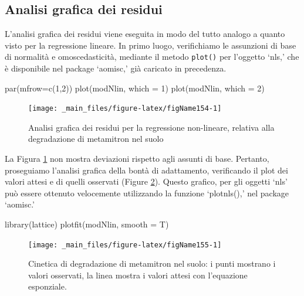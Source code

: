 \documentclass[a4paper,12pt,oneside]{book}
\newenvironment{Shaded}{\begin{snugshade}}{\end{snugshade}}
\newcommand{\DecValTok}[1]{#1}
\newcommand{\FunctionTok}[1]{#1}
\newcommand{\AttributeTok}[1]{#1}
\newcommand{\NormalTok}[1]{#1}
\begin{document}
\hypertarget{analisi-grafica-dei-residui-1}{%
\subsection{Analisi grafica dei residui}\label{analisi-grafica-dei-residui-1}}

L'analisi grafica dei residui viene eseguita in modo del tutto analogo a quanto visto per la regressione lineare. In primo luogo, verifichiamo le assunzioni di base di normalità e omoscedasticità, mediante il metodo \texttt{plot()} per l'oggetto `nls,' che è disponibile nel package `aomisc,' già caricato in precedenza.

\begin{Shaded}
\begin{Highlighting}[]
\FunctionTok{par}\NormalTok{(}\AttributeTok{mfrow=}\FunctionTok{c}\NormalTok{(}\DecValTok{1}\NormalTok{,}\DecValTok{2}\NormalTok{))}
\FunctionTok{plot}\NormalTok{(modNlin, }\AttributeTok{which =} \DecValTok{1}\NormalTok{)}
\FunctionTok{plot}\NormalTok{(modNlin, }\AttributeTok{which =} \DecValTok{2}\NormalTok{)}
\end{Highlighting}
\end{Shaded}

\begin{figure}

{\centering \texttt{[image: \_main\_files/figure-latex/figName154-1]} 

}

\caption{Analisi grafica dei residui per la regressione non-lineare, relativa alla degradazione di metamitron nel suolo}\label{fig:figName154}
\end{figure}

La Figura \ref{fig:figName154} non mostra deviazioni rispetto agli assunti di base. Pertanto, proseguiamo l'analisi grafica della bontà di adattamento, verificando il plot dei valori attesi e di quelli osservati (Figure \ref{fig:figName155}). Questo grafico, per gli oggetti `nls' può essere ottenuto velocemente utilizzando la funzione `plotnls(),' nel package `aomisc.'

\begin{Shaded}
\begin{Highlighting}[]
\FunctionTok{library}\NormalTok{(lattice)}
\FunctionTok{plotfit}\NormalTok{(modNlin, }\AttributeTok{smooth =}\NormalTok{ T)}
\end{Highlighting}
\end{Shaded}

\begin{figure}

{\centering \texttt{[image: \_main\_files/figure-latex/figName155-1]} 

}

\caption{Cinetica di degradazione di metamitron nel suolo: i punti mostrano i valori osservati, la linea mostra i valori attesi con l'equazione esponziale.}\label{fig:figName155}
\end{figure}
\end{document}
